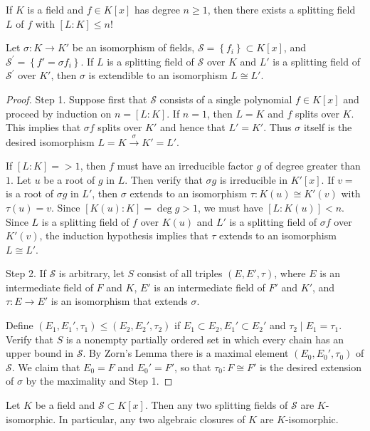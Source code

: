 \begin{theorem}
    If $K$ is a field and $ f  \in  K [ x ]$ has degree ${n} \geq 1$, then there exists a splitting field $L$ of $f$ with $[L: K] \leq {n}!$
\end{theorem}
\begin{theorem}
    Let $\sigma:  K  \rightarrow {K'}$ be an isomorphism of fields, $\mathcal{S}=\left\{ f _{{i}}\right\}\subset  K [ x ]$, and $\mathcal{S}^\prime=\left\{f'=\sigma  f _{{i}}\right\}$.
    If $L$ is a splitting field of $\mathcal{S}$ over $K$ and $L'$ is a splitting field of ${\mathcal{S}}^\prime$ over $K'$, then $\sigma$ is extendible to an isomorphism ${L} \cong  {L'}$.
    \begin{proof}
        Step 1. Suppose first that $\mathcal{S}$ consists of a single polynomial $f \in K[x]$ and proceed by induction on $n=[L: K]$.
        If $n=1$, then $L=K$ and $f$ splits over $K$. This implies that $\sigma f$ splits over $K'$ and hence that $L'=K'$. Thus $\sigma$ itself is the desired isomorphism $L=K \xrightarrow{\sigma} K'=L'$.

        If $\left[L:K\right]=>1$, then $f$ must have an irreducible factor $g$ of degree greater than $1$.
        Let $u$ be a root of $g$ in $L$. Then verify that $\sigma g$ is irreducible in $K'[x]$. If $v=$ is a root of $\sigma g$ in $L'$, then $\sigma$ extends to an isomorphism $\tau: K(u) \cong K'(v)$ with $\tau(u)=v$.
        Since $[K(u): K]=\deg g>1$, we must have $[L: K(u)]<n$. Since $L$ is a splitting field of $f$ over $K(u)$ and $L'$ is a splitting field of $\sigma f$ over $K'(v)$, the induction hypothesis implies that $\tau$ extends to an isomorphism $L \cong L'$.

        Step 2. If $\mathcal{S}$ is arbitrary, let $S$ consist of all triples  $\left(E, E', \tau\right)$, where $E$ is an intermediate field of $F$ and $K$, $E'$ is an intermediate field of $F'$ and $K'$, and $\tau: E \rightarrow E'$ is an isomorphism that extends $\sigma$.

        Define $\left(E_1, E_1', \tau_1\right) \leq\left(E_2, E_2', \tau_2\right)$ if $E_1 \subset E_2, E_1' \subset E_2'$ and $\tau_2 \mid E_1=\tau_1$. Verify that $S$ is a nonempty partially ordered set in which every chain has an upper bound in $\mathcal{S}$. By Zorn's Lemma there is a maximal element $\left(E_0, E_0', \tau_0\right)$  of $\mathcal{S}$. We claim that $E_0=F$ and $E_0'=F'$, so that $\tau_0: F \cong F'$ is the desired extension of $\sigma$ by the maximality and Step 1.
    \end{proof}
\end{theorem}
\begin{corollary}
    Let $K$ be a field and $\mathcal{S}\subset  K[x]$.
    Then any two splitting fields of $\mathcal{S}$ are $K$-isomorphic. In particular, any two algebraic closures of $K$ are $K$-isomorphic.
\end{corollary}




